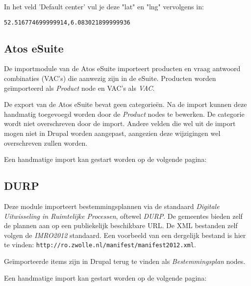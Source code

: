 In het veld 'Default center' vul je deze "lat" en "lng" vervolgens in:
\begin{verbatim}
52.516774699999914,6.083021899999936
\end{verbatim}

\subsection{Atos eSuite}

De importmodule van de Atos eSuite importeert producten en vraag antwoord combinaties (VAC's) die aanwezig zijn in de eSuite. Producten worden ge\"{i}mporteerd als \emph{Product} node en VAC's als \emph{VAC}.

De export van de Atos eSuite bevat geen categorie\"{e}n. Na de import kunnen deze handmatig toegevoegd worden door de \emph{Product} nodes te bewerken. De categorie wordt niet overschreven door de import. Andere velden die wel uit de import mogen niet in Drupal worden aangepast, aangezien deze wijzigingen wel overschreven zullen worden.

Een handmatige import kan gestart worden op de volgende pagina: \\

\subsection{DURP}

Deze module importeert bestemmingsplannen via de standaard \emph{Digitale Uitwisseling in Ruimtelijke Processen}, oftewel \emph{DURP}. De gemeentes bieden zelf de plannen aan op een publiekelijk beschikbare URL. De XML bestanden zelf volgen de \emph{IMRO2012} standaard. Een voorbeeld van een dergelijk bestand is hier te vinden:
\texttt{http://ro.zwolle.nl/manifest/manifest2012.xml}.

Ge\"{i}mporteerde items zijn in Drupal terug te vinden als \emph{Bestemmingsplan} nodes.

Een handmatige import kan gestart worden op de volgende pagina: \\
